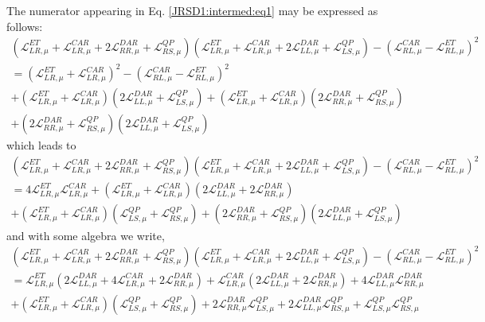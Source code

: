 The numerator appearing in Eq. \eqref{JRSD1:intermed:eq1} may be expressed as follows:
\begin{multline*}
(\mathcal{L}_{LR,\mu}^{ET}+\mathcal{L}_{LR,\mu}^{CAR}+2\mathcal{L}_{RR,\mu}^{DAR}+\mathcal{L}^{QP}_{RS,\mu})
(\mathcal{L}_{LR,\mu}^{ET}+\mathcal{L}_{LR,\mu}^{CAR}+2\mathcal{L}_{LL,\mu}^{DAR}+\mathcal{L}^{QP}_{LS,\mu})
-(\mathcal{L}_{RL,\mu}^{CAR}-\mathcal{L}_{RL,\mu}^{ET})^{2}
\\=
(\mathcal{L}_{LR,\mu}^{ET}+\mathcal{L}_{LR,\mu}^{CAR})^{2}
-
(\mathcal{L}_{RL,\mu}^{CAR}-\mathcal{L}_{RL,\mu}^{ET})^{2}
\\+
(\mathcal{L}_{LR,\mu}^{ET}+\mathcal{L}_{LR,\mu}^{CAR})
(2\mathcal{L}_{LL,\mu}^{DAR}+\mathcal{L}^{QP}_{LS,\mu})
+
(\mathcal{L}_{LR,\mu}^{ET}+\mathcal{L}_{LR,\mu}^{CAR})
(2\mathcal{L}_{RR,\mu}^{DAR}+\mathcal{L}^{QP}_{RS,\mu})
\\+
(2\mathcal{L}_{RR,\mu}^{DAR}+\mathcal{L}^{QP}_{RS,\mu})
(2\mathcal{L}_{LL,\mu}^{DAR}+\mathcal{L}^{QP}_{LS,\mu})
\end{multline*}
which leads to 
\begin{multline*}
(\mathcal{L}_{LR,\mu}^{ET}+\mathcal{L}_{LR,\mu}^{CAR}+2\mathcal{L}_{RR,\mu}^{DAR}+\mathcal{L}^{QP}_{RS,\mu})
(\mathcal{L}_{LR,\mu}^{ET}+\mathcal{L}_{LR,\mu}^{CAR}+2\mathcal{L}_{LL,\mu}^{DAR}+\mathcal{L}^{QP}_{LS,\mu})
-(\mathcal{L}_{RL,\mu}^{CAR}-\mathcal{L}_{RL,\mu}^{ET})^{2}
\\=
4\mathcal{L}_{LR,\mu}^{ET}\mathcal{L}_{LR,\mu}^{CAR}
+
(\mathcal{L}_{LR,\mu}^{ET}+\mathcal{L}_{LR,\mu}^{CAR})
(2\mathcal{L}_{LL,\mu}^{DAR}+2\mathcal{L}_{RR,\mu}^{DAR})
\\+
(\mathcal{L}_{LR,\mu}^{ET}+\mathcal{L}_{LR,\mu}^{CAR})
(\mathcal{L}^{QP}_{LS,\mu}+\mathcal{L}^{QP}_{RS,\mu})
+
(2\mathcal{L}_{RR,\mu}^{DAR}+\mathcal{L}^{QP}_{RS,\mu})
(2\mathcal{L}_{LL,\mu}^{DAR}+\mathcal{L}^{QP}_{LS,\mu})
\end{multline*}
and with some algebra we write,
\begin{multline*}
(\mathcal{L}_{LR,\mu}^{ET}+\mathcal{L}_{LR,\mu}^{CAR}+2\mathcal{L}_{RR,\mu}^{DAR}+\mathcal{L}^{QP}_{RS,\mu})
(\mathcal{L}_{LR,\mu}^{ET}+\mathcal{L}_{LR,\mu}^{CAR}+2\mathcal{L}_{LL,\mu}^{DAR}+\mathcal{L}^{QP}_{LS,\mu})
-(\mathcal{L}_{RL,\mu}^{CAR}-\mathcal{L}_{RL,\mu}^{ET})^{2}
\\=
\mathcal{L}_{LR,\mu}^{ET}
(2\mathcal{L}_{LL,\mu}^{DAR}+4\mathcal{L}_{LR,\mu}^{CAR}+2\mathcal{L}_{RR,\mu}^{DAR})
+
\mathcal{L}_{LR,\mu}^{CAR}
(2\mathcal{L}_{LL,\mu}^{DAR}+2\mathcal{L}_{RR,\mu}^{DAR})
+
4\mathcal{L}_{LL,\mu}^{DAR}\mathcal{L}_{RR,\mu}^{DAR}
\\+
(\mathcal{L}_{LR,\mu}^{ET}+\mathcal{L}_{LR,\mu}^{CAR})
(\mathcal{L}^{QP}_{LS,\mu}+\mathcal{L}^{QP}_{RS,\mu})
+
2\mathcal{L}_{RR,\mu}^{DAR}\mathcal{L}^{QP}_{LS,\mu}
+
2\mathcal{L}_{LL,\mu}^{DAR}\mathcal{L}^{QP}_{RS,\mu}
+
\mathcal{L}^{QP}_{LS,\mu}\mathcal{L}^{QP}_{RS,\mu}
\end{multline*}
